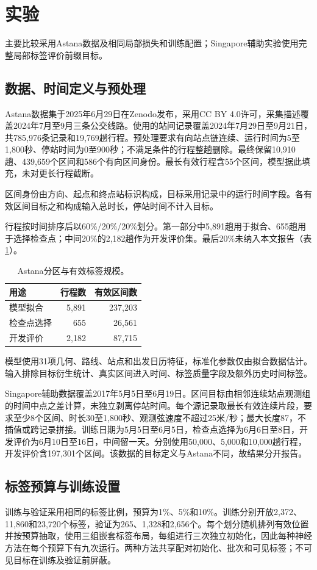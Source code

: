 \section{实验}
主要比较采用Astana数据及相同局部损失和训练配置；Singapore辅助实验使用完整局部标签评价前缀目标。

\subsection{数据、时间定义与预处理}
Astana数据集\cite{astana2025}于2025年6月29日在Zenodo发布，采用CC BY 4.0许可，采集描述覆盖2024年7月至9月三条公交线路。使用的站间记录覆盖2024年7月29日至9月21日，共785,976条记录和19,769趟行程。预处理要求有向站点链连续、运行时间为5至1,800秒、停站时间为0至900秒；不满足条件的行程整趟删除。最终保留10,910趟、439,659个区间和586个有向区间身份。最长有效行程含55个区间，模型据此填充，未对更长行程截断。

区间身份由方向、起点和终点站标识构成，目标采用记录中的运行时间字段。各有效区间目标之和构成输入总时长，停站时间不计入目标。

行程按时间排序后以60\%/20\%/20\%划分。第一部分中5,891趟用于拟合、655趟用于选择检查点；中间20\%的2,182趟作为开发评价集。最后20\%未纳入本文报告（表\ref{tab:partitions}）。
\begin{table}[t]
\centering\footnotesize
\caption{Astana分区与有效标签规模。}\label{tab:partitions}
\begin{tabular}{lrr}\toprule
用途 & 行程数 & 有效区间数\\\midrule
模型拟合 & 5,891 & 237,203\\
检查点选择 & 655 & 26,561\\
开发评价 & 2,182 & 87,715\\
\bottomrule\end{tabular}
\end{table}

模型使用31项几何、路线、站点和出发日历特征，标准化参数仅由拟合数据估计。输入排除目标衍生统计、真实区间进入时间、标签质量字段及额外历史时间标签。

Singapore辅助数据覆盖2017年5月5日至6月19日。区间目标由相邻连续站点观测组的时间中点之差计算，未独立剥离停站时间。每个源记录取最长有效连续片段，要求至少8个区间、时长30至1,800秒、观测弦速度不超过25米/秒；最大长度87，不插值或跨记录拼接。训练日期为5月5日至6月5日，检查点选择为6月6日至8日，开发评价为6月10日至16日，中间留一天。分别使用50,000、5,000和10,000趟行程，开发评价含197,301个区间。该数据的目标定义与Astana不同，故结果分开报告。

\subsection{标签预算与训练设置}
训练与验证采用相同的标签比例，预算为1\%、5\%和10\%。训练分别开放2,372、11,860和23,720个标签，验证为265、1,328和2,656个。每个划分随机排列有效位置并按预算抽取，使用三组嵌套标签布局，每组进行三次独立初始化，因此每种神经方法在每个预算下有九次运行。两种方法共享配对初始化、批次和可见标签；不可见目标在训练及验证前屏蔽。

